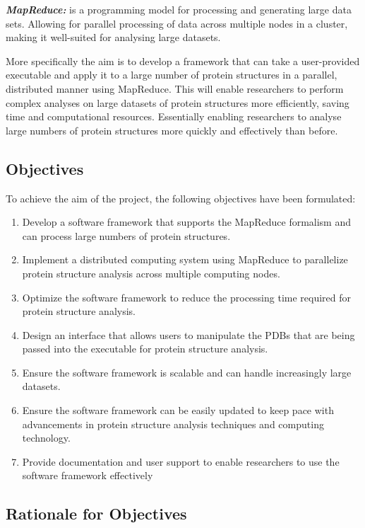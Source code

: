 \documentclass[]{final_report}
\begin{document}
\textbf{\textit{MapReduce:}} is a programming model for processing and generating large data sets. Allowing for parallel processing of data across multiple nodes in a cluster, making it well-suited for analysing large datasets.

More specifically the aim is to develop a framework that can take a user-provided executable and apply it to a large number of protein structures in a parallel, distributed manner using MapReduce. This will enable researchers to perform complex analyses on large datasets of protein structures more efficiently, saving time and computational resources. Essentially enabling researchers to analyse large numbers of protein structures more quickly and effectively than before.
\clearpage

\subsection{Objectives}

To achieve the aim of the project, the following objectives have been formulated:

\begin{enumerate}
    \item Develop a software framework that supports the MapReduce formalism and can process large numbers of protein structures.
    \item Implement a distributed computing system using MapReduce to parallelize protein structure analysis across multiple computing nodes.
    \item Optimize the software framework to reduce the processing time required for protein structure analysis.
    \item Design an interface that allows users to manipulate the PDBs that are being passed into the executable for protein structure analysis.
    \item Ensure the software framework is scalable and can handle increasingly large datasets.
    \item Ensure the software framework can be easily updated to keep pace with advancements in protein structure analysis techniques and computing technology.
    \item Provide documentation and user support to enable researchers to use the software framework effectively
\end{enumerate}
\clearpage

\subsection{Rationale for Objectives}
\end{document}
